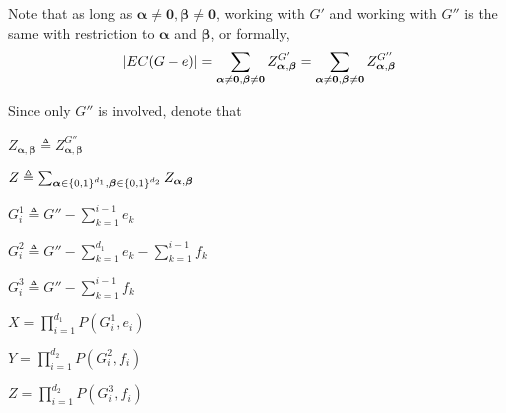 	Note that as long as $\boldsymbol\alpha \neq \mathbf{0} , \boldsymbol\beta \neq \mathbf{0}$, working with $G'$ and working with $G''$ is the same with restriction to $\boldsymbol\alpha$ and $\boldsymbol\beta$, or formally,
\[\left\vert EC(G-e)\right\vert = \sum_{\boldsymbol\alpha \neq \mathbf{0}, \boldsymbol\beta \neq \mathbf{0}} Z_{\boldsymbol\alpha, \boldsymbol\beta}^{G'} = \sum_{\boldsymbol\alpha \neq \mathbf{0}, \boldsymbol\beta \neq \mathbf{0}} Z_{\boldsymbol\alpha, \boldsymbol\beta}^{G''}\]

Since only $G''$ is involved, denote that

$Z_{\boldsymbol\alpha, \boldsymbol\beta} \triangleq Z_{\boldsymbol\alpha, \boldsymbol\beta}^{G''}$

$Z \triangleq \sum_{\boldsymbol\alpha \in \left\{0,1\right\}^{d_1} , \boldsymbol\beta \in \left\{0,1\right\}^{d_2}} Z_{\boldsymbol\alpha, \boldsymbol\beta}$


    $G_i^1 \triangleq G'' - \sum_{k=1}^{i-1} e_k$

    $G_i^2 \triangleq G'' - \sum_{k=1}^{d_1}e_k - \sum_{k=1}^{i-1} f_k$

    $G_i^3 \triangleq G'' - \sum_{k=1}^{i-1} f_k$

    $X = \prod_{i=1}^{d_1} P(G_i^1, e_i)$

    $Y = \prod_{i=1}^{d_2} P(G_i^2, f_i)$

    $Z = \prod_{i=1}^{d_2} P(G_i^3, f_i)$



